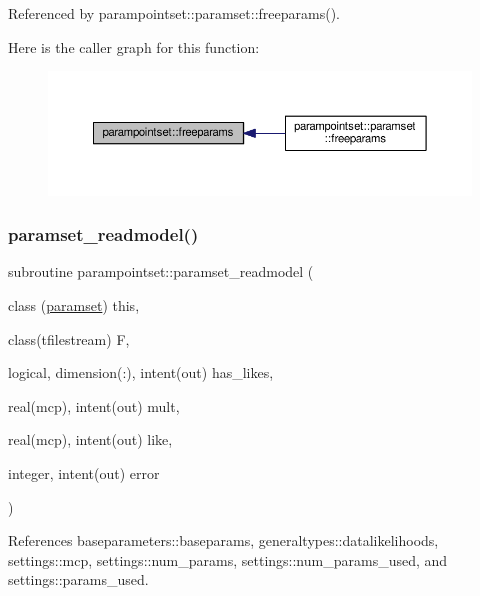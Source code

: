 Referenced by parampointset\+::paramset\+::freeparams().

Here is the caller graph for this function\+:
\nopagebreak
\begin{figure}[H]
\begin{center}
\leavevmode
\includegraphics[width=350pt]{namespaceparampointset_a4403c38deb2c08ca00d3629b211eaeae_icgraph}
\end{center}
\end{figure}
\mbox{\label{namespaceparampointset_a41f49e842311c3c0441a2e7a36914a40}} 
\subsubsection{\texorpdfstring{paramset\+\_\+readmodel()}{paramset\_readmodel()}}
{\footnotesize\ttfamily subroutine parampointset\+::paramset\+\_\+readmodel (\begin{DoxyParamCaption}\item[{class (\mbox{\hyperlink{structparampointset_1_1paramset}{paramset}})}]{this,  }\item[{class(tfilestream)}]{F,  }\item[{logical, dimension(\+:), intent(out)}]{has\+\_\+likes,  }\item[{real(mcp), intent(out)}]{mult,  }\item[{real(mcp), intent(out)}]{like,  }\item[{integer, intent(out)}]{error }\end{DoxyParamCaption})}



References baseparameters\+::baseparams, generaltypes\+::datalikelihoods, settings\+::mcp, settings\+::num\+\_\+params, settings\+::num\+\_\+params\+\_\+used, and settings\+::params\+\_\+used.

\mbox{\label{namespaceparampointset_ab3c28fc8a1787822aeec7c139ae0ff5a}} 
